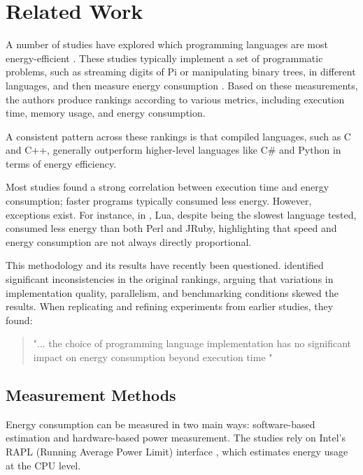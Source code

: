\documentclass[main.tex]{subfiles}
\begin{document}
\section{Related Work}

A number of studies have explored which programming languages are most energy-efficient \cite{pereira2017energy, Pereira_Couto_Ribeiro_Rua_Cunha_Fernandes_Saraiva_2021, Couto_Pereira_Ribeiro_Rua_Saraiva_2017, Gordillo_Calero_Moraga_García_Fernandes_Abreu_Saraiva_2024}. These studies typically implement a set of programmatic problems, such as streaming digits of Pi or manipulating binary trees, in different languages, and then measure energy consumption \cite[Table 1]{pereira2017energy}. Based on these measurements, the authors produce rankings according to various metrics, including execution time, memory usage, and energy consumption. 

A consistent pattern across these rankings is that compiled languages, such as C and C++, generally outperform higher-level languages like C\# and Python in terms of energy efficiency. 

Most studies found a strong correlation between execution time and energy consumption; faster programs typically consumed less energy. However, exceptions exist. For instance, in \textcite[Table 7]{Couto_Pereira_Ribeiro_Rua_Saraiva_2017}, Lua, despite being the slowest language tested, consumed less energy than both Perl and JRuby, highlighting that speed and energy consumption are not always directly proportional.

This methodology and its results have recently been questioned. \textcite{Kempen_Kwon_Nguyen_Berger_2024} identified significant inconsistencies in the original rankings, arguing that variations in implementation quality, parallelism, and benchmarking conditions skewed the results. When replicating and refining experiments from earlier studies, they found:

\begin{quote}
    "... the choice of programming language implementation has no significant impact on energy consumption beyond execution time " \cite[page 1, abstract]{Kempen_Kwon_Nguyen_Berger_2024}
\end{quote}

\subsection{Measurement Methods}

Energy consumption can be measured in two main ways: software-based estimation and hardware-based power measurement. The studies \textcite{pereira2017energy, Pereira_Couto_Ribeiro_Rua_Cunha_Fernandes_Saraiva_2021, Couto_Pereira_Ribeiro_Rua_Saraiva_2017} rely on Intel's RAPL (Running Average Power Limit) interface \cite{khan2018rapl}, which estimates energy usage at the CPU level.
\end{document}
